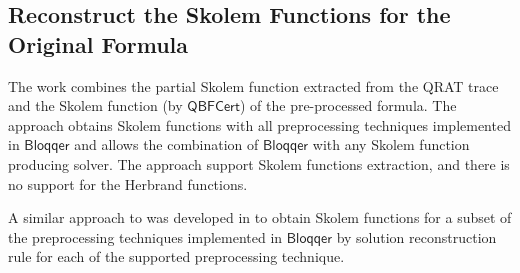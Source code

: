 \documentclass[runningheads]{llncs}
\newcommand{\bloqqer}{\mathsf{Bloqqer}}
\newcommand{\0}{0}
\newcommand{\1}{1}
\def\qcert{\mathsf{QBFCert}}
\begin{document}
\subsection{Reconstruct the Skolem Functions for the Original Formula} \label{subsec:skolem-compete}

The work \cite{FazekasHSB17} combines the partial Skolem function extracted from the QRAT trace and the Skolem function (by $\qcert$) of the pre-processed formula. The approach obtains Skolem functions with all preprocessing techniques implemented in  $\bloqqer$ and allows the combination of $\bloqqer$ with any Skolem function producing solver. The approach support Skolem functions extraction, and there is no support for the Herbrand functions.

A similar approach to  \cite{FazekasHSB17} was developed in \cite{JanotaGM13} to obtain Skolem functions for a subset of the preprocessing techniques implemented in $\bloqqer$ by solution reconstruction rule for each of the supported preprocessing technique.
\end{document}
